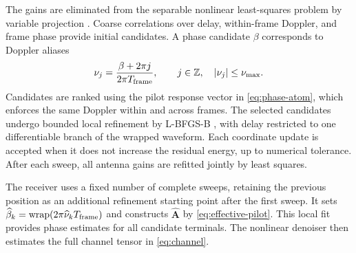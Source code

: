 The gains are eliminated from the separable nonlinear least-squares
problem by variable projection \cite{oleary2013}. Coarse correlations over
delay, within-frame Doppler, and frame phase provide initial candidates.
A phase candidate $\beta$ corresponds to Doppler aliases
\begin{equation}
 \nu_j=\frac{\beta+2\pi j}{2\pi T_{\rm frame}},\qquad
 j\in\mathbb Z,\quad |\nu_j|\leq\nu_{\max}.
 \label{eq:phase-aliases}
\end{equation}
Candidates are ranked using the pilot response vector in
\eqref{eq:phase-atom}, which enforces the same Doppler within and across
frames. The selected candidates undergo bounded local refinement by
L-BFGS-B \cite{zhu1997}, with delay restricted to one differentiable
branch of the wrapped waveform. Each coordinate update is accepted
when it does not increase the residual energy, up to numerical tolerance.
After each sweep, all antenna gains are refitted jointly by least squares.

The receiver uses a fixed number of complete sweeps, retaining the previous
position as an additional refinement starting point after the first sweep.
It sets $\widehat\beta_k=\operatorname{wrap}
(2\pi\widehat\nu_kT_{\rm frame})$ and constructs
$\widehat{\mathbf A}$ by \eqref{eq:effective-pilot}.
This local fit provides phase estimates for all candidate terminals.
The nonlinear denoiser then estimates the full channel tensor in
\eqref{eq:channel}.

